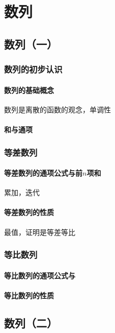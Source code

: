 \part{数列}
\chapter{数列（一）}

\section{数列的初步认识}
\subsection{数列的基础概念}
数列是离散的函数的观念，单调性
\clearpage
\subsection{和与通项}
\clearpage

\section{等差数列}
\subsection{等差数列的通项公式与前\texorpdfstring{$n$}n项和}
累加，迭代
\clearpage

\subsection{等差数列的性质}
最值，证明是等差等比
\clearpage

\section{等比数列}
\subsection{等比数列的通项公式与}
\clearpage

\subsection{等比数列的性质}
\clearpage

\chapter{数列（二）}

